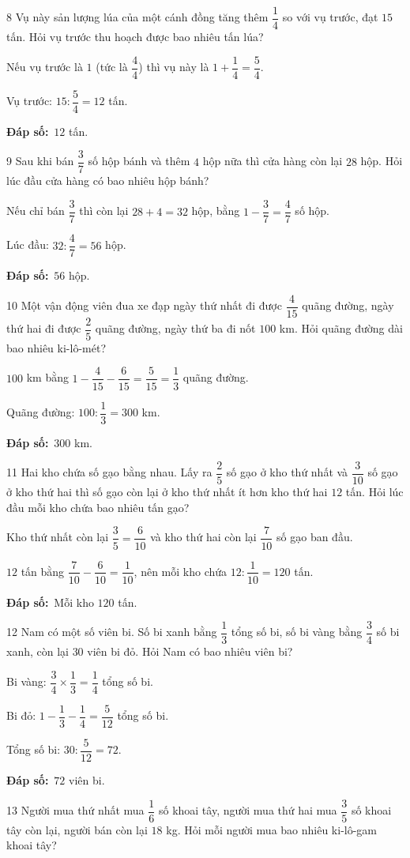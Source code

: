 \documentclass[11pt]{article}
\newif\ifsol \solfalse
\providecommand{\AnsWord}{Đáp số}
\newcommand{\dapso}[1]{\par\textbf{\AnsWord:}\ #1}
\newcommand{\probsol}[1]{%
  \begin{lrbox}{\solmeasure}\begin{minipage}{\dimexpr\linewidth-24pt\relax}#1\end{minipage}\end{lrbox}%
  \ifsol
    \begin{solbox}#1\end{solbox}%
  \else
    \setlength{\solht}{\dimexpr\ht\solmeasure+\dp\solmeasure+0.85cm\relax}%
    \ifdim\solht<1.35cm\setlength{\solht}{1.35cm}\fi
    \begin{tcolorbox}[colback=white,colframe=Line,boxrule=0.8pt,arc=5pt,
      left=8pt,right=8pt,top=4pt,bottom=4pt,height=\solht]{\footnotesize\color{Slate}\itshape\WorkWord}\end{tcolorbox}%
  \fi}
\newcommand{\gap}{\vspace{0.3cm}}
\def\WorkWord{Bài làm:}
\def\AnsWord{Đáp số}
\begin{document}
\gap
\begin{probbox}{8}{\relax}
Vụ này sản lượng lúa của một cánh đồng tăng thêm $\dfrac14$ so với vụ trước, đạt $15$ tấn. Hỏi vụ trước thu hoạch được bao nhiêu tấn lúa?
\end{probbox}
\probsol{
Nếu vụ trước là $1$ (tức là $\dfrac44$) thì vụ này là $1+\dfrac14=\dfrac54$.\par
Vụ trước: $15:\dfrac54=12$ tấn.
\dapso{$12$ tấn.}}
\gap
\begin{probbox}{9}{\relax}
Sau khi bán $\dfrac37$ số hộp bánh và thêm $4$ hộp nữa thì cửa hàng còn lại $28$ hộp. Hỏi lúc đầu cửa hàng có bao nhiêu hộp bánh?
\end{probbox}
\probsol{
Nếu chỉ bán $\dfrac37$ thì còn lại $28+4=32$ hộp, bằng $1-\dfrac37=\dfrac47$ số hộp.\par
Lúc đầu: $32:\dfrac47=56$ hộp.
\dapso{$56$ hộp.}}
\gap
\begin{probbox}{10}{\relax}
Một vận động viên đua xe đạp ngày thứ nhất đi được $\dfrac4{15}$ quãng đường, ngày thứ hai đi được $\dfrac25$ quãng đường, ngày thứ ba đi nốt $100$ km. Hỏi quãng đường dài bao nhiêu ki-lô-mét?
\end{probbox}
\probsol{
$100$ km bằng $1-\dfrac4{15}-\dfrac6{15}=\dfrac5{15}=\dfrac13$ quãng đường.\par Quãng đường: $100:\dfrac13=300$ km.
\dapso{$300$ km.}}
\gap
\begin{probbox}{11}{\relax}
Hai kho chứa số gạo bằng nhau. Lấy ra $\dfrac25$ số gạo ở kho thứ nhất và $\dfrac3{10}$ số gạo ở kho thứ hai thì số gạo còn lại ở kho thứ nhất ít hơn kho thứ hai $12$ tấn. Hỏi lúc đầu mỗi kho chứa bao nhiêu tấn gạo?
\end{probbox}
\probsol{
Kho thứ nhất còn lại $\dfrac35=\dfrac6{10}$ và kho thứ hai còn lại $\dfrac7{10}$ số gạo ban đầu.\par
$12$ tấn bằng $\dfrac7{10}-\dfrac6{10}=\dfrac1{10}$, nên mỗi kho chứa $12:\dfrac1{10}=120$ tấn.
\dapso{Mỗi kho $120$ tấn.}}
\gap
\begin{probbox}{12}{\relax}
Nam có một số viên bi. Số bi xanh bằng $\dfrac13$ tổng số bi, số bi vàng bằng $\dfrac34$ số bi xanh, còn lại $30$ viên bi đỏ. Hỏi Nam có bao nhiêu viên bi?
\end{probbox}
\probsol{
Bi vàng: $\dfrac34\times\dfrac13=\dfrac14$ tổng số bi.\par Bi đỏ: $1-\dfrac13-\dfrac14=\dfrac5{12}$ tổng số bi.\par
Tổng số bi: $30:\dfrac5{12}=72$.
\dapso{$72$ viên bi.}}
\gap
\begin{probbox}{13}{\relax}
Người mua thứ nhất mua $\dfrac16$ số khoai tây, người mua thứ hai mua $\dfrac35$ số khoai tây còn lại, người bán còn lại $18$ kg. Hỏi mỗi người mua bao nhiêu ki-lô-gam khoai tây?
\end{probbox}
\end{document}
